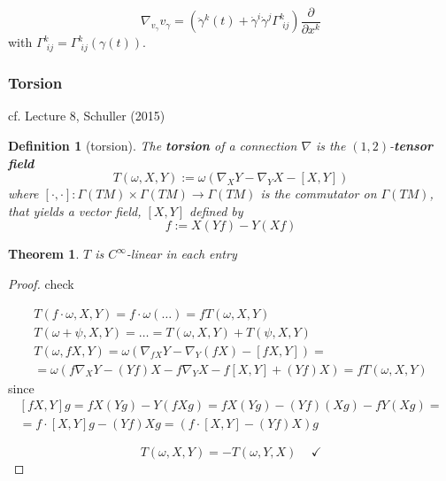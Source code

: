 \documentclass[10pt]{amsart}
\newtheorem{theorem}{Theorem}
\newtheorem{definition}{Definition}
\begin{document}
\begin{multicols*}{2}
\begin{equation}
	\boxed{ \nabla_{v_{\gamma}} v_{\gamma} = \left( \ddot{\gamma}^k(t) + \dot{\gamma}^i \dot{\gamma}^j \Gamma^k_{\, \, ij} \right) \frac{\partial }{ \partial x^k}  }
\end{equation}
with $\Gamma^k_{\, \, ij} = \Gamma^k_{\, \, ij}(\gamma(t))$.

\subsubsection{Torsion}
cf. Lecture 8, Schuller (2015) \cite{Schul2015}

\begin{definition}[torsion]
	The \textbf{torsion} of a connection $\nabla$ is the $(1,2)$-\textbf{tensor field}
	\begin{equation}
		T(\omega,X,Y) := \omega( \nabla_X Y - \nabla_Y X - [X,Y])
	\end{equation}
where $[\cdot, \cdot] : \Gamma(TM) \times \Gamma(TM) \to \Gamma(TM)$ is the commutator on $\Gamma(TM)$, that yields a vector field, $[X, Y]$ defined by
\begin{equation}
	[X,Y]f:= X(Yf) - Y(Xf)
\end{equation}
\end{definition}

\begin{theorem}
$T$ is $C^{\infty}$-linear in each entry
\end{theorem}

\begin{proof}
	check 
	
	\[
	\begin{gathered}
		T(f\cdot \omega, X, Y) = f\cdot \omega(\dots) = fT(\omega, X, Y) \\
		T(\omega + \psi, X, Y) = \dots = T(\omega, X, Y) + T(\psi, X, Y) \\
		T(\omega, fX, Y) = \omega( \nabla_{fX} Y - \nabla_Y (fX) - [fX, Y]) = \\
		= \omega(f\nabla_X Y - (Yf)X - f\nabla_Y X - f[X,Y] + (Yf)X) = fT(\omega,X,Y)
	\end{gathered}
	\]
	since
	\[
	\begin{gathered} 
		[fX,Y] g = fX(Yg) - Y(fXg) = fX(Yg) - (Yf) (Xg) - fY(Xg) = \\
		= f\cdot [X,Y] g - (Yf) Xg = (f\cdot [X,Y] - (Yf)X) g
	\end{gathered} 
	\]
	
	\[
	T(\omega, X, Y) = -T(\omega, Y , X)  \quad \, \checkmark
	\]
\end{proof}


\end{multicols*}
\end{document}
